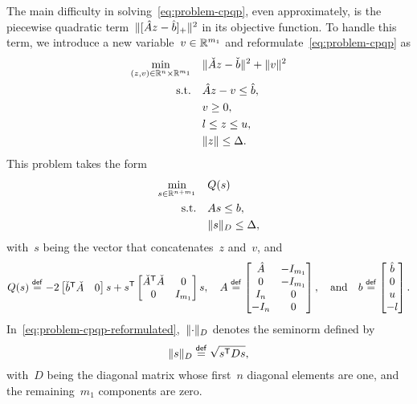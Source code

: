 The main difficulty in solving~\cref{eq:problem-cpqp}, even approximately, is the piecewise quadratic term~$\lVert[\hat{A} z - \hat{b}]_+\rVert^2$ in its objective function.
To handle this term, we introduce a new variable~$v \in \mathbb{R}^{m_1}$ and reformulate~\cref{eq:problem-cpqp} as
\begin{align*}
    \min_{(z, v) \in \R^n \times \R^{m_1}}  & \quad \norm{\check{A} z - \check{b}}^2 + \norm{v}^2\\
    \text{s.t.}                             & \quad \hat{A} z - v \le \hat{b},\\
                                            & \quad v \ge 0,\\
                                            & \quad \xl \le z \le \xu,\\
                                            & \quad \norm{z} \le \rad.
\end{align*}
This problem takes the form
\begin{subequations}
    \label{eq:problem-cpqp-reformulated}
    \begin{align}
        \min_{\sstep \in \R^{n + m_1}}  & \quad Q(\sstep)\\
        \text{s.t.}                     & \quad A \sstep \le b,\\
                                        & \quad \norm{\sstep}_{D} \le \rad, \label{eq:problem-cpqp-reformulated-tr}
    \end{align}
\end{subequations}
with~$s$ being the vector that concatenates~$z$ and~$v$, and
\begin{equation*}
    Q(\sstep) \eqdef - 2 \begin{bmatrix} \check{b}^{\T} \check{A} & 0 \end{bmatrix} s + s^{\T} \begin{bmatrix} \check{A}^{\T} \check{A} & 0\\ 0 & I_{m_1} \end{bmatrix} s, \quad 
    A \eqdef
    \begin{bmatrix}
        \hat{A} & -I_{m_1}\\
        0       & -I_{m_1}\\
        I_n     & 0\\
        -I_n    & 0
    \end{bmatrix}, \quad \text{and} \quad
    b \eqdef
    \begin{bmatrix}
        \hat{b}\\
        0\\
        \xu\\
        -\xl
    \end{bmatrix}.
\end{equation*}
In~\cref{eq:problem-cpqp-reformulated},~$\lVert\cdot\rVert_D$ denotes the seminorm defined by
\begin{equation*}
    \norm{\sstep}_D \eqdef \sqrt{\sstep^{\T} D \sstep},
\end{equation*}
with~$D$ being the diagonal matrix whose first~$n$ diagonal elements are one, and the remaining~$m_1$ components are zero.

